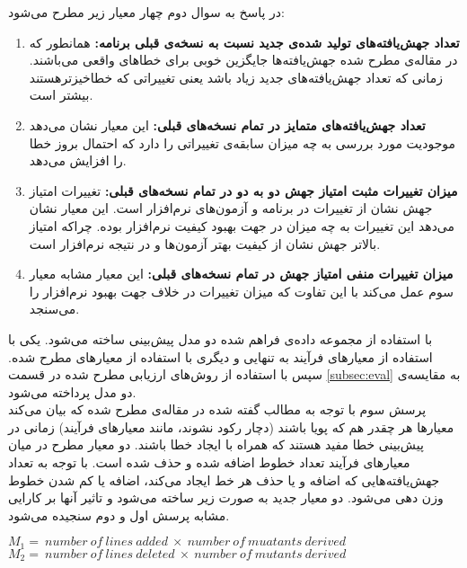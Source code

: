 در پاسخ به سوال دوم چهار معیار زیر مطرح می‌شود:
\begin{enumerate}

	\item  
	\textbf{
	تعداد جهش‌یافته‌های تولید شده‌ی جدید نسبت به نسخه‌ی قبلی برنامه: }همانطور که در مقاله‌ی \cite{just2014mutants} مطرح شده جهش‌یافته‌ها جایگزین خوبی برای خطاهای واقعی می‌باشند. زمانی که تعداد جهش‌یافته‌های جدید زیاد باشد یعنی تغییراتی که خطا‌خیز‌ترهستند بیشتر است. 
	\item 
	\textbf{
	تعداد جهش‌یافته‌های متمایز در تمام نسخه‌های قبلی:} این معیار نشان می‌دهد موجودیت مورد بررسی به چه میزان سابقه‌ی تغییراتی را دارد که احتمال بروز خطا را افزایش می‌دهد.
	
	\item 
	\textbf{
	میزان تغییرات مثبت امتیاز جهش دو به دو در تمام نسخه‌های قبلی:}
تغییرات امتیاز جهش نشان از تغییرات در برنامه و آزمون‌های نرم‌افزار است.     این معیار نشان می‌دهد این تغییرات به چه میزان در جهت بهبود کیفیت نرم‌افزار بوده. چراکه امتیاز بالاتر جهش نشان از کیفیت بهتر آزمون‌ها و در نتیجه نرم‌افزار است. 
	\item 
	\textbf{
	میزان تغییرات منفی امتیاز جهش در تمام نسخه‌های قبلی:}
این معیار مشابه معیار سوم عمل می‌کند با این تفاوت که میزان تغییرات در خلاف جهت بهبود نرم‌افزار را می‌سنجد. 	
\end{enumerate}
با استفاده از مجموعه داده‌ی فراهم شده دو مدل پیش‌بینی ساخته می‌شود. یکی با استفاده از معیارهای فرآیند به تنهایی و دیگری با استفاده از معیارهای مطرح شده. سپس با استفاده از روش‌های ارزیابی مطرح شده در قسمت \ref{subsec:eval}  به مقایسه‌ی دو مدل پرداخته می‌شود.\\

پرسش سوم با توجه به مطالب گفته شده در مقاله‌ی \cite{rahman2013and} مطرح شده که بیان می‌کند معیارها هر چقدر هم که پویا باشند (دچار رکود نشوند، مانند معیارهای فرآیند) زمانی در پیش‌بینی خطا مفید هستند که همراه با ایجاد خطا باشند.  دو معیار مطرح در میان معیارهای فرآیند تعداد خطوط اضافه شده و حذف شده است. با توجه به تعداد جهش‌یافته‌هایی که  اضافه  و یا حذف هر خط ایجاد می‌کند، اضافه یا کم شدن خطوط وزن دهی می‌شود. دو معیار جدید به صورت زیر ساخته می‌شود و تاثیر آنها بر کارایی مشابه پرسش اول و دوم سنجیده می‌شود. \\
\begin{latin}
	
	$M_1 =\ number\ of\ lines\ added\ \times \ number\ of\ muatants\ derived$\\
	
	$M_2 =\ number\ of\ lines\ deleted\ \times \ number\ of\ mutants\ derived$\\
\end{latin}



 